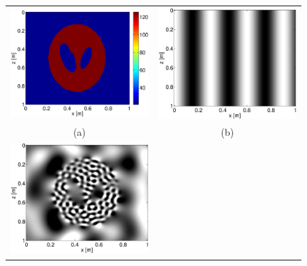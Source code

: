 \documentclass{article}
\begin{document}
\begin{figure}
\centering
\begin{tabular}{cc}
\includegraphics[scale=.3]{exp1_k}&
\includegraphics[scale=.3]{exp1_q}\\
{\small (a)}&{\small (b)}\\
\includegraphics[scale=.3]{exp1_u}&

\end{tabular}
\end{figure}
\end{document}
